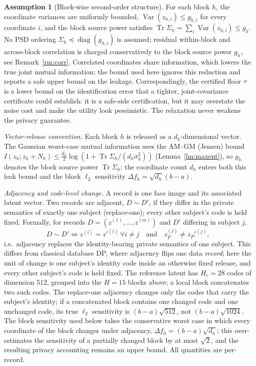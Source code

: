 \documentclass[10pt,twocolumn,letterpaper]{article}
\theoremstyle{plain}
\theoremstyle{definition}
\newtheorem{assumption}{Assumption}
\begin{document}
\begin{assumption}[Block-wise second-order structure]
\label{as:indep}
For each block $h$, the coordinate variances are uniformly bounded,
$\operatorname{Var}(z_{h,i})\le g_{h,i}$ for every coordinate $i$, and the
block source power satisfies
$\operatorname{Tr}\Sigma_h=\sum_i\operatorname{Var}(z_{h,i})\le g_h$. No PSD
ordering $\Sigma_h\preceq\operatorname{diag}(g_{h,i})$ is assumed; residual
within-block and across-block correlation is charged conservatively to the
block source power $g_h$, see Remark~\ref{rm:corr}. Correlated
coordinates share information, which lowers the true joint mutual information;
the bound used here ignores this reduction and reports a safe upper bound on
the leakage. Correspondingly, the certified floor $\tau$ is a lower bound on
the identification error that a tighter, joint-covariance certificate could
establish: it is a safe-side certification, but it may overstate the noise cost
and make the utility look pessimistic. The relaxation never weakens the privacy
guarantee.
\end{assumption}

\emph{Vector-release convention.} Each block $h$ is released as a
$d_h$-dimensional vector. The Gaussian worst-case mutual information uses the
AM--GM (Jensen) bound
$I(z_h;z_h+N_h)\le\tfrac{d_h}{2}\log(1+\operatorname{Tr}\Sigma_h/(d_h\sigma_h^2))$
(Lemma~\ref{lm:maxent}), so $g_h$ denotes the block source power
$\operatorname{Tr}\Sigma_h$; the coordinate count $d_h$ enters both this leak
bound and the block $\ell_2$ sensitivity $\Delta f_h=\sqrt{d_h}(b-a)$.

\emph{Adjacency and code-level change.} A record is one face image and its
associated latent vector. Two records are adjacent, $D\sim D'$, if they differ
in the private semantics of exactly one subject (replace-one); every other
subject's code is held fixed. Formally, for records $D=(z^{(1)},\ldots,z^{(m)})$
and $D'$ differing in subject $j$,
\begin{equation}
D\sim D'\iff z^{(i)}=z'^{(i)}\ \forall i\ne j
\quad\text{and}\quad z_P^{(j)}\ne z_P'^{(j)},
\label{eq:adjacency}
\end{equation}
i.e.\ adjacency replaces the identity-bearing private semantics of one subject.
This differs from classical database DP, where adjacency flips one data
\emph{record}; here the unit of change is one subject's identity code inside an
otherwise fixed release, and every other subject's code is held fixed.
The reference latent has $H_{\mathrm c}=28$ codes of dimension $512$, grouped
into the $H=15$ blocks above; a local block concatenates two such codes. The
replace-one adjacency changes only the codes that carry the subject's identity;
if a concatenated block contains one changed code and one unchanged code, its
true $\ell_2$ sensitivity is $(b-a)\sqrt{512}$, not $(b-a)\sqrt{1024}$. The
block sensitivity used below takes the conservative worst case in which every
coordinate of the block changes under adjacency,
$\Delta f_h=(b-a)\sqrt{d_h}$; this over-estimates the sensitivity of a
partially changed block by at most $\sqrt{2}$, and the resulting privacy
accounting remains an upper bound. All quantities are per-record.
\end{document}
